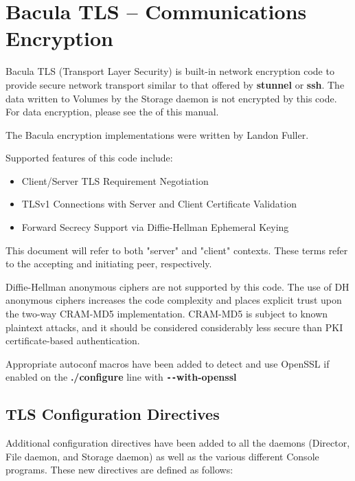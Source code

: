 
\chapter{Bacula TLS -- Communications Encryption}
\label{CommEncryption}

Bacula TLS (Transport Layer Security) is built-in network
encryption code to provide secure network transport similar to
that offered by {\bf stunnel} or {\bf ssh}.  The data written to  
Volumes by the Storage daemon is not encrypted by this code.
For data encryption, please see the  of this manual.

The Bacula encryption implementations were written by Landon Fuller.

Supported features of this code include: 
\begin{itemize} 
\item Client/Server TLS Requirement Negotiation 
\item TLSv1 Connections with Server and Client Certificate
Validation 
\item Forward Secrecy Support via Diffie-Hellman Ephemeral Keying 
\end{itemize}

This document will refer to both "server" and "client" contexts.  These
terms refer to the accepting and initiating peer, respectively.

Diffie-Hellman anonymous ciphers are not supported by this code.  The
use of DH anonymous ciphers increases the code complexity and places
explicit trust upon the two-way CRAM-MD5 implementation.  CRAM-MD5 is
subject to known plaintext attacks, and it should be considered
considerably less secure than PKI certificate-based authentication.

Appropriate autoconf macros have been added to detect and use OpenSSL  
if enabled on the {\bf ./configure} line with {\bf \verb?--?with-openssl}

\section{TLS Configuration Directives}
Additional configuration directives have been added to all the daemons
(Director, File daemon, and Storage daemon) as well as the various
different Console programs.
These new directives are defined as follows:

